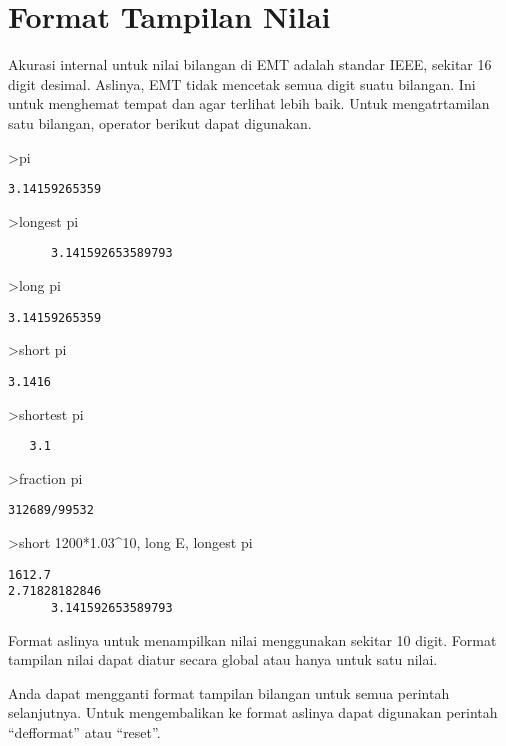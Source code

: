 \documentclass[
]{book}
\begin{document}
\chapter{Format Tampilan Nilai}\label{format-tampilan-nilai}

Akurasi internal untuk nilai bilangan di EMT adalah standar IEEE, sekitar 16 digit desimal. Aslinya, EMT tidak mencetak semua digit suatu bilangan. Ini untuk menghemat tempat dan agar terlihat lebih baik. Untuk mengatrtamilan satu bilangan, operator berikut dapat digunakan.

\textgreater pi

\begin{verbatim}
3.14159265359
\end{verbatim}

\textgreater longest pi

\begin{verbatim}
      3.141592653589793 
\end{verbatim}

\textgreater long pi

\begin{verbatim}
3.14159265359
\end{verbatim}

\textgreater short pi

\begin{verbatim}
3.1416
\end{verbatim}

\textgreater shortest pi

\begin{verbatim}
   3.1 
\end{verbatim}

\textgreater fraction pi

\begin{verbatim}
312689/99532
\end{verbatim}

\textgreater short 1200*1.03\^{}10, long E, longest pi

\begin{verbatim}
1612.7
2.71828182846
      3.141592653589793 
\end{verbatim}

Format aslinya untuk menampilkan nilai menggunakan sekitar 10 digit. Format tampilan nilai dapat diatur secara global atau hanya untuk satu nilai.

Anda dapat mengganti format tampilan bilangan untuk semua perintah selanjutnya. Untuk mengembalikan ke format aslinya dapat digunakan perintah ``defformat'' atau ``reset''.
\end{document}
